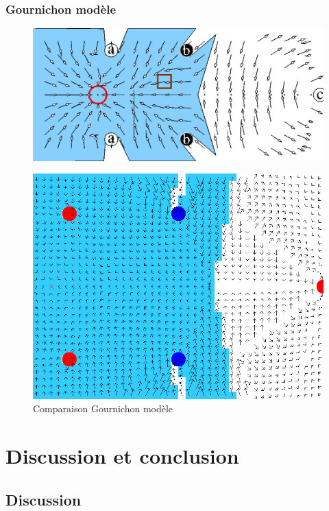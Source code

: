 \documentclass{beamer}
\begin{document}
\begin{frame}
  \frametitle{Gournichon modèle}
  \begin{figure}
    \centering
    \includegraphics[scale=0.3]{color_article.png}
  \end{figure}
  \begin{figure}
    \centering
    \includegraphics[scale=0.15]{color_res.png}
    \caption{Comparaison Gournichon modèle}
  \end{figure}  
\end{frame}

\section{Discussion et conclusion}

\subsection{Discussion}
\end{document}

